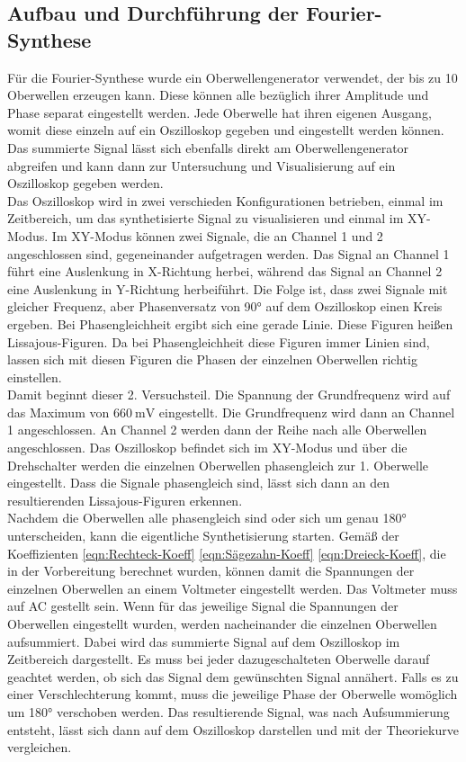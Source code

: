 \subsection{Aufbau und Durchführung der Fourier-Synthese}
Für die Fourier-Synthese wurde ein Oberwellengenerator verwendet, der bis zu
10 Oberwellen erzeugen kann. Diese können alle bezüglich ihrer Amplitude und Phase separat eingestellt werden.
Jede Oberwelle hat ihren eigenen Ausgang, womit diese einzeln auf ein Oszilloskop gegeben und
eingestellt werden können. Das summierte Signal lässt sich ebenfalls direkt am Oberwellengenerator
abgreifen und kann dann zur Untersuchung und Visualisierung auf ein Oszilloskop gegeben werden.\\
\noindent Das Oszilloskop wird in zwei verschieden Konfigurationen betrieben, einmal im Zeitbereich, um
das synthetisierte Signal zu visualisieren und einmal im XY-Modus. Im XY-Modus können zwei Signale, die an
Channel 1 und 2 angeschlossen sind, gegeneinander aufgetragen werden. Das Signal an Channel 1 führt eine Auslenkung in 
X-Richtung herbei, während das Signal an Channel 2 eine Auslenkung in Y-Richtung herbeiführt.
Die Folge ist, dass zwei Signale mit gleicher Frequenz, aber Phasenversatz
von 90° auf dem Oszilloskop einen Kreis ergeben. Bei Phasengleichheit ergibt sich eine gerade Linie. Diese Figuren
heißen Lissajous-Figuren. Da bei Phasengleichheit diese Figuren immer Linien sind, lassen sich mit diesen Figuren die Phasen
der einzelnen Oberwellen richtig einstellen. \\
\noindent Damit beginnt dieser 2. Versuchsteil. Die Spannung der Grundfrequenz wird auf das Maximum
von $\qty{660}{\mV}$ eingestellt. Die Grundfrequenz wird dann an Channel 1 angeschlossen. An Channel 2 werden dann der Reihe nach alle Oberwellen angeschlossen.
Das Oszilloskop befindet sich im XY-Modus und über die Drehschalter werden die einzelnen Oberwellen phasengleich zur 1. Oberwelle eingestellt.
Dass die Signale phasengleich sind, lässt sich dann an den resultierenden Lissajous-Figuren erkennen.\\
\noindent Nachdem die Oberwellen alle phasengleich sind oder sich um genau 180° unterscheiden, kann die eigentliche
Synthetisierung starten. Gemäß der Koeffizienten \eqref{eqn:Rechteck-Koeff} \eqref{eqn:Sägezahn-Koeff} \eqref{eqn:Dreieck-Koeff}, die in der Vorbereitung berechnet wurden, können damit die Spannungen
der einzelnen Oberwellen an einem Voltmeter eingestellt werden. Das Voltmeter muss auf AC gestellt sein.
Wenn für das jeweilige Signal die Spannungen der Oberwellen eingestellt wurden, werden nacheinander die einzelnen
Oberwellen aufsummiert. Dabei wird das summierte Signal auf dem Oszilloskop im Zeitbereich
dargestellt. Es muss bei jeder dazugeschalteten Oberwelle darauf geachtet werden, ob sich das Signal dem
gewünschten Signal annähert. Falls es zu einer Verschlechterung kommt, muss die jeweilige Phase der Oberwelle womöglich um 180°
verschoben werden. Das resultierende Signal, was nach Aufsummierung
entsteht, lässt sich dann auf dem Oszilloskop darstellen und mit der Theoriekurve vergleichen.